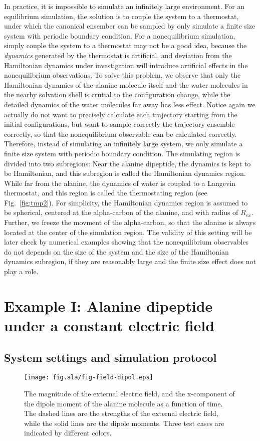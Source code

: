 \documentclass[aip,jcp,a4paper,preprint,onecolumn]{revtex4-1}
\begin{document}
In practice, it is impossible to simulate an infinitely large
environment.  For an equilibrium simulation, the solution is to couple
the system to a thermostat, under which the canonical ensember can be
sampled by only simulate a finite size system with periodic boundary
condition. For a nonequilibrium simulation, simply couple the system
to a thermostat may not be a good idea, because the \emph{dynamics}
generated by the thermostat is artificial, and deviation from the
Hamiltonian dynamics under investigation will introduce artificial
effects in the nonequilibrium observations. To solve this problem, we
observe that only the Hamiltonian dynamics of the alanine molecule
itself and the water molecules in the nearby solvation shell is
crutial to the configuration change, while the detailed dynamics of
the water molecules far away has less effect. Notice again we actually
do not want to precisely calculate each trajectory starting from the
initial configurations, but want to sample correctly the trajectory
ensemble correctly, so that the nonequilibrium observable can be
calculated correctly.  Therefore, instead of simulating an infinitely
large system, we only simulate a finite size system with periodic
boundary condition. The simulating region is divided into two
subregions: Near the alanine dipeptide, the dynamics is kept to be
Hamiltonian, and this subregion is called the Hamiltonian dynamics
region. While far from the alanine, the dynamics of water is coupled
to a Langevin thermostat, and this region is called the thermostating
region (see Fig.~\ref{fig:tmp2}).  For simplicity, the Hamiltonian
dynamics region is assumed to be spherical, centered at the
alpha-carbon of the alanine, and with radius of $R_{ex}$.  Further, we
freeze the movment of the alpha-carbon, so that the alanine is always
located at the center of the simulation region.  The validity of this
setting will be later check by numerical examples showing that the
nonequilibrium observables do not depends on the size of the system
and the size of the Hamiltonian dynamics subregion, if they are
reasonably large and the finite size effect does not play a role.


\section{Example I: Alanine dipeptide
  under a constant electric field}

\subsection{System settings and simulation protocol}
\begin{figure}
  \centering
  \texttt{[image: fig.ala/fig-field-dipol.eps]}
  \caption{The magnitude of the external electric field, and the
    x-component of the dipole moment of the alanine molecule as a
    function of time. The dashed lines are the strengths of the
    external electric field, while the solid lines are the dipole
    moments. Three test cases are indicated by different colors.}
  \label{fig:tmp3}
\end{figure}
\end{document}
